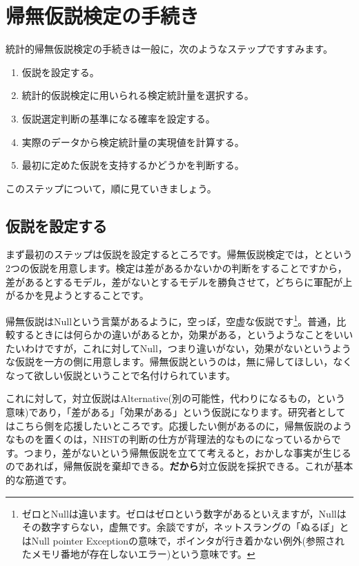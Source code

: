 \documentclass{ltjsbook}
\begin{document}
\section{帰無仮説検定の手続き}
統計的帰無仮説検定の手続きは一般に，次のようなステップですすみます。
\begin{enumerate}
	\item 仮説を設定する。
	\item 統計的仮説検定に用いられる検定統計量を選択する。
	\item 仮説選定判断の基準になる確率を設定する。
	\item 実際のデータから検定統計量の実現値を計算する。
	\item 最初に定めた仮説を支持するかどうかを判断する。
\end{enumerate}

このステップについて，順に見ていきましょう。
\subsection{仮説を設定する}
まず最初のステップは仮説を設定するところです。帰無仮説検定では，とという2つの仮説を用意します。検定は差があるかないかの判断をすることですから，差があるとするモデル，差がないとするモデルを勝負させて，どちらに軍配が上がるかを見ようとすることです。

帰無仮説はNullという言葉があるように，空っぽ，空虚な仮説です\footnote{ゼロとNullは違います。ゼロはゼロという数字があるといえますが，Nullはその数字すらない，虚無です。余談ですが，ネットスラングの「ぬるぽ」とはNull pointer Exceptionの意味で，ポインタが行き着かない例外(参照されたメモリ番地が存在しないエラー)という意味です。}。普通，比較するときには何らかの違いがあるとか，効果がある，というようなことをいいたいわけですが，これに対してNull，つまり違いがない，効果がないというような仮説を一方の側に用意します。帰無仮説というのは，無に帰してほしい，なくなって欲しい仮説ということで名付けられています。

これに対して，対立仮説はAlternative(別の可能性，代わりになるもの，という意味)であり，「差がある」「効果がある」という仮説になります。研究者としてはこちら側を応援したいところです。応援したい側があるのに，帰無仮説のようなものを置くのは，NHSTの判断の仕方が背理法的なものになっているからです。つまり，差がないという帰無仮説を立てて考えると，おかしな事実が生じるのであれば，帰無仮説を棄却できる。\textbf{だから}対立仮説を採択できる。これが基本的な筋道です。
\end{document}
